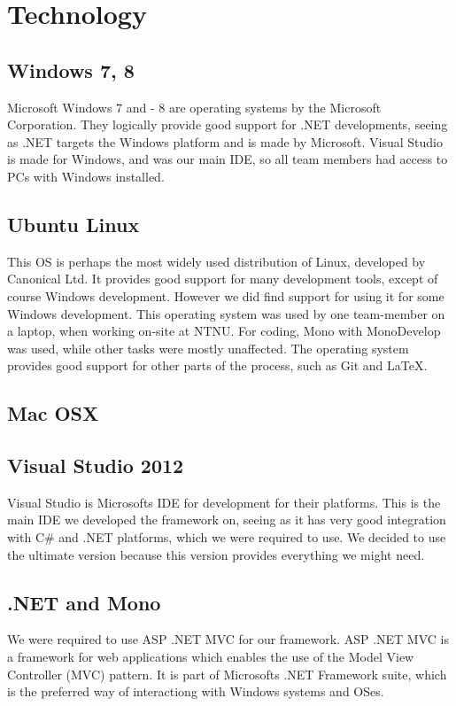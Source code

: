 \section{Technology}

\subsection{Windows 7, 8}
Microsoft Windows 7 and - 8 are operating systems by the Microsoft Corporation. They logically provide good support for .NET developments, seeing as .NET targets the Windows platform and is made by Microsoft. Visual Studio is made for Windows, and was our main IDE, so all team members had access to PCs with Windows installed.

\subsection{Ubuntu Linux}
This OS is perhaps the most widely used distribution of Linux, developed by Canonical Ltd. It provides good support for many development tools, except of course Windows development. However we did find support for using it for some Windows development.
This operating system was used by one team-member on a laptop, when working on-site at NTNU. For coding, Mono with MonoDevelop was used, while other tasks were mostly unaffected. The operating system provides good support for other parts of the process, such as Git and \LaTeX.

\subsection{Mac OSX}

\subsection{Visual Studio 2012}
Visual Studio is Microsofts IDE for development for their platforms. This is the main IDE we developed the framework on, seeing as it has very good integration with C\# and .NET platforms, which we were required to use. We decided to use the ultimate version because this version provides everything we might need.

\subsection{.NET and Mono}
We were required to use ASP .NET MVC for our framework. ASP .NET MVC is a framework for web applications which enables the use of the Model View Controller (MVC) pattern. It is part of Microsofts .NET Framework suite, which is the preferred way of interactiong with Windows systems and OSes.

